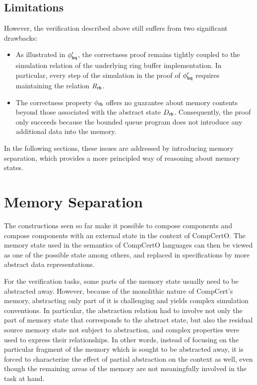 \subsection{Limitations}
\label{sec:ox:limitations}

However, the verification described above still suffers from two significant drawbacks:
\begin{itemize}
  \item As illustrated in $\phi'_{ \mathsf{bq} }$, the correctness proof remains
    tightly coupled to the simulation relation of the underlying ring buffer
    implementation.
    In particular,
    every step of the simulation in the proof of
    $\phi'_{ \mathsf{bq} }$ requires maintaining the relation $R_{ \mathsf{rb} }$.
  \item The correctness property $\phi_{ \mathsf{rb} }$
    offers no guarantee about memory contents
    beyond those associated with the abstract state $D_{ \mathsf{rb} }$.
    Consequently, the proof only succeeds
    because the bounded queue program does not
    introduce any additional data into the memory.
\end{itemize}

In the following sections,
these issues are addressed by introducing memory separation,
which provides a more principled way of reasoning about memory states.

\section{Memory Separation}
\label{sec:ox:separation}

The constructions seen so far make it possible to compose components and
compose components with an external state in the context of CompCertO. The memory
state used in the semantics of CompCertO languages can then be viewed as one of
the possible state among others, and replaced in specifications by more abstract
data representations.

For the verification tasks, some parts of the
memory state usually need to be abstracted away. However, because of the monolithic nature of CompCert's memory,
abstracting only part of it is challenging and yields complex simulation
conventions. In particular,
the abstraction relation had to involve
not only the part of memory state that corresponds to the abstract state,
but also the residual source memory state
not subject to abstraction,
and complex properties were used to express their relationships.
In other words,
instead of focusing on the particular fragment of the memory
which is sought to be abstracted away,
it is forced to characterize the effect of partial abstraction
on the context as well,
even though the remaining areas of the memory
are not meaningfully involved in the task at hand.

